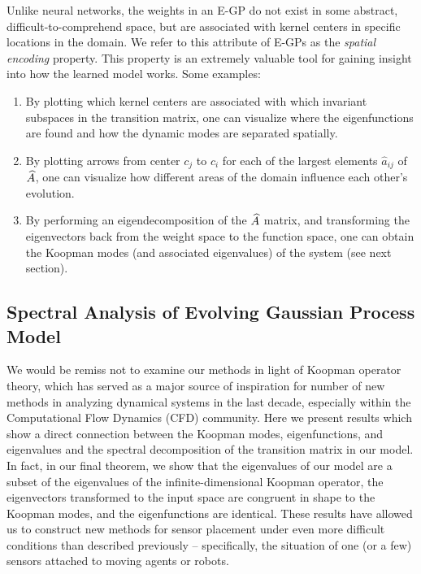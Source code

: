 Unlike neural networks, the weights in an E-GP do not exist in some abstract, difficult-to-comprehend space, but are associated with kernel centers in specific locations in the domain. We refer to this attribute of E-GPs as the \emph{spatial encoding} property. This property is an extremely valuable tool for gaining insight into how the learned model works. Some examples:
\begin{enumerate}
	\item By plotting which kernel centers are associated with which invariant subspaces in the transition matrix, one can visualize where the eigenfunctions are found and how the dynamic modes are separated spatially.
	\item By plotting arrows from center $c_j$ to $c_i$ for each of the largest elements $\hat a_{ij}$ of $\widehat{A}$, one can visualize how different areas of the domain influence each other's evolution.
	\item By performing an eigendecomposition of the $\widehat{A}$ matrix, and transforming the eigenvectors back from the weight space to the function space, one can obtain the Koopman modes (and associated eigenvalues) of the system (see next section).
\end{enumerate}



\subsection{Spectral Analysis of Evolving Gaussian Process Model}

We would be remiss not to examine our methods in light of Koopman operator theory, which has served as a major source of inspiration for number of new methods in analyzing dynamical systems in the last decade, especially within the Computational Flow Dynamics (CFD) community. Here we present results which show a direct connection between the Koopman modes, eigenfunctions, and eigenvalues and the spectral decomposition of the transition matrix in our model. In fact, in our final theorem, we show that the eigenvalues of our model are a subset of the eigenvalues of the infinite-dimensional Koopman operator, the eigenvectors transformed to the input space are congruent in shape to the Koopman modes, and the eigenfunctions are identical. These results have allowed us to construct new methods for sensor placement under even more difficult conditions than described previously -- specifically, the situation of one (or a few) sensors attached to moving agents or robots.

